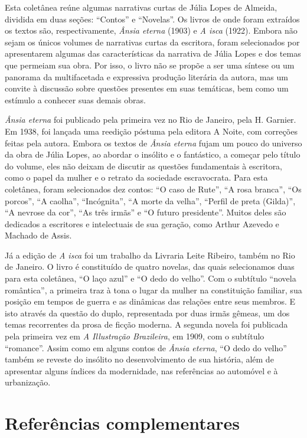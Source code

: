\documentclass[12pt]{extarticle}
\begin{document}
Esta coletânea reúne algumas narrativas curtas de Júlia Lopes de
Almeida, dividida em duas seções: ``Contos'' e ``Novelas''. Os livros de
onde foram extraídos os textos são, respectivamente, \emph{Ânsia eterna}
(1903) e \emph{A isca} (1922). Embora não sejam os únicos volumes de
narrativas curtas da escritora, foram selecionados por apresentarem
algumas das características da narrativa de Júlia Lopes e dos temas que
permeiam sua obra. Por isso, o livro não se propõe a ser uma síntese ou
um panorama da multifacetada e expressiva produção literária da autora,
mas um convite à discussão sobre questões presentes em suas temáticas,
bem como um estímulo a conhecer suas demais obras.

\emph{Ânsia eterna} foi publicado pela primeira vez no Rio de Janeiro,
pela H. Garnier. Em 1938, foi lançada uma reedição póstuma pela editora
A Noite, com correções feitas pela autora. Embora os textos de
\emph{Ânsia eterna} fujam um pouco do universo da obra de Júlia Lopes,
ao abordar o insólito e o fantástico, a começar pelo título do volume,
eles não deixam de discutir as questões fundamentais à escritora, como o
papel da mulher e o retrato da sociedade escravocrata. Para esta
coletânea, foram selecionados dez contos: ``O caso de Rute'', ``A rosa
branca'', ``Os porcos'', ``A caolha'', ``Incógnita'', ``A morte da
velha'', ``Perfil de preta (Gilda)'', ``A nevrose da cor'', ``As três
irmãs'' e ``O futuro presidente''. Muitos deles são dedicados a
escritores e intelectuais de sua geração, como Arthur Azevedo e Machado
de Assis.

Já a edição de \emph{A isca} foi um trabalho da Livraria Leite Ribeiro,
também no Rio de Janeiro. O livro é constituído de quatro novelas, das
quais selecionamos duas para esta coletânea, ``O laço azul'' e ``O dedo
do velho''. Com o subtítulo ``novela romântica'', a primeira traz à tona
o lugar da mulher na constituição familiar, sua posição em tempos de
guerra e as dinâmicas das relações entre seus membros. E isto através da
questão do duplo, representada por duas irmãs gêmeas, um dos temas
recorrentes da prosa de ficção moderna. A segunda novela foi publicada
pela primeira vez em \emph{A Illustração Brazileira}, em 1909, com o
subtítulo ``romance''. Assim como em alguns contos de \emph{Ânsia
eterna}, ``O dedo do velho'' também se reveste do insólito no
desenvolvimento de sua história, além de apresentar alguns índices da
modernidade, nas referências ao automóvel e à urbanização.

\section{Referências complementares}
\end{document}
